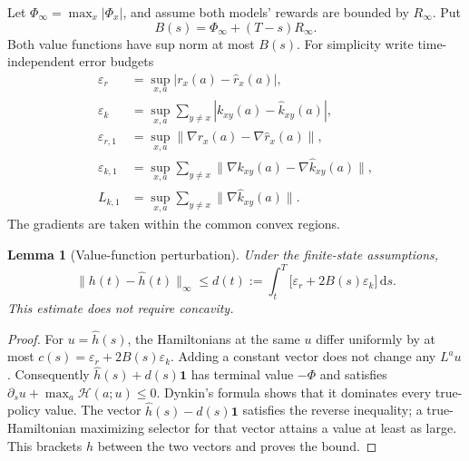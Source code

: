\documentclass[11pt]{article}
\theoremstyle{plain}
\newtheorem{lemma}[theorem]{Lemma}
\theoremstyle{definition}
\theoremstyle{remark}
\newcommand{\dd}{\,\mathrm d}
\newcommand{\norm}[1]{\lVert#1\rVert}
\newcommand{\HH}{\mathcal H}
\begin{document}
Let \(\Phi_\infty=\max_x|\Phi_x|\), and assume both models' rewards are
bounded by \(R_\infty\). Put
\[
B(s)=\Phi_\infty+(T-s)R_\infty.
\]
Both value functions have sup norm at most \(B(s)\).
For simplicity write time-independent error budgets
\begin{align*}
\varepsilon_r&=\sup_{x,a}|r_x(a)-\widehat r_x(a)|,\\
\varepsilon_k&=\sup_{x,a}\sum_{y\ne x}|k_{xy}(a)-\widehat k_{xy}(a)|,\\
\varepsilon_{r,1}&=\sup_{x,a}\norm{\nabla r_x(a)-\nabla\widehat r_x(a)},\\
\varepsilon_{k,1}&=\sup_{x,a}\sum_{y\ne x}
\norm{\nabla k_{xy}(a)-\nabla\widehat k_{xy}(a)},\\
L_{k,1}&=\sup_{x,a}\sum_{y\ne x}\norm{\nabla\widehat k_{xy}(a)} .
\end{align*}
The gradients are taken within the common convex regions.

\begin{lemma}[Value-function perturbation]\label{lem:valueerror}
Under the finite-state assumptions,
\begin{equation}\label{eq:valueerror}
\norm{h(t)-\widehat h(t)}_\infty
\le d(t):=\int_t^T
\big[\varepsilon_r+2B(s)\varepsilon_k\big]\dd s .
\end{equation}
This estimate does not require concavity.
\end{lemma}
\begin{proof}
For \(u=\widehat h(s)\), the Hamiltonians at the same \(u\) differ
uniformly by at most
\(c(s)=\varepsilon_r+2B(s)\varepsilon_k\).
Adding a constant vector does not change any \(L^a u\).
Consequently \(\widehat h(s)+d(s)\mathbf1\) has terminal value
\(-\Phi\) and satisfies
\(\partial_s u+\max_a\HH(a;u)\le0\).
Dynkin's formula shows that it dominates every true-policy value.
The vector \(\widehat h(s)-d(s)\mathbf1\) satisfies the reverse
inequality; a true-Hamiltonian maximizing selector for that vector
attains a value at least as large. This brackets \(h\) between the two
vectors and proves the bound.
\end{proof}
\end{document}
